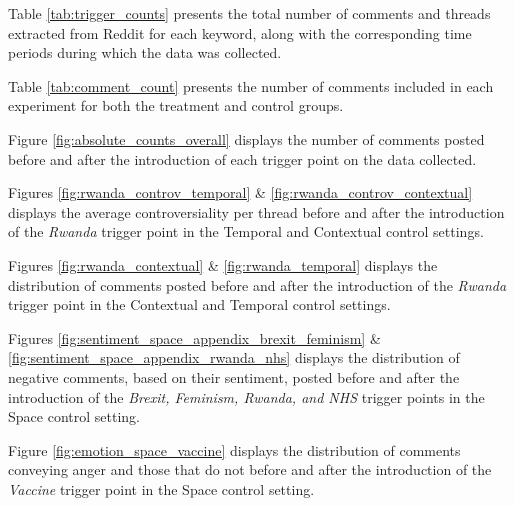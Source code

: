 Table \ref{tab:trigger_counts} presents the total number of comments and threads extracted from Reddit for each keyword, along with the corresponding time periods during which the data was collected.

Table \ref{tab:comment_count} presents the number of comments included in each experiment for both the treatment and control groups.

Figure \ref{fig:absolute_counts_overall} displays the number of comments posted before and after the introduction of each trigger point on the data collected.

Figures \ref{fig:rwanda_controv_temporal} \& \ref{fig:rwanda_controv_contextual} displays the average controversiality per thread before and after the introduction of the \textit{Rwanda} trigger point in the Temporal and Contextual control settings.

Figures \ref{fig:rwanda_contextual} \& \ref{fig:rwanda_temporal} displays the distribution of comments posted before and after the introduction of the \textit{Rwanda} trigger point in the Contextual and Temporal control settings.

Figures \ref{fig:sentiment_space_appendix_brexit_feminism} \& \ref{fig:sentiment_space_appendix_rwanda_nhs} displays the distribution of negative comments, based on their sentiment, posted before and after the introduction of the \textit{Brexit, Feminism, Rwanda, and NHS} trigger points in the Space control setting.

Figure \ref{fig:emotion_space_vaccine} displays the distribution of comments conveying anger and those that do not before and after the introduction of the \textit{Vaccine} trigger point in the Space control setting.


